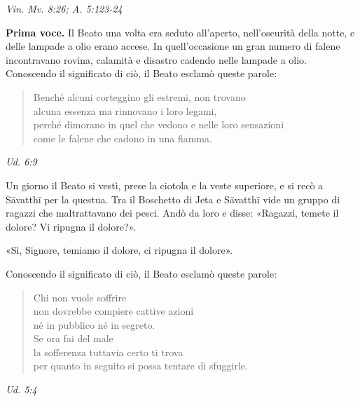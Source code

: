 \emph{Vin. Mv. 8:26; A. 5:123-24}


\textbf{Prima voce.} Il Beato una volta era seduto all’aperto, nell’oscurità
della notte, e delle lampade a olio erano accese. In quell’occasione un
gran numero di falene incontravano rovina, calamità e disastro cadendo
nelle lampade a olio. Conoscendo il significato di ciò, il Beato esclamò
queste parole:


\begin{quotation}
Benché alcuni corteggino gli estremi, non trovano \\
alcuna essenza ma rinnovano i loro legami, \\
perché dimorano in quel che vedono e nelle loro sensazioni \\
come le falene che cadono in una fiamma.
\end{quotation}

\emph{Ud. 6:9}


Un giorno il Beato si vestì, prese la ciotola e la veste superiore, e si
recò a Sāvatthī per la questua. Tra il Boschetto di Jeta e Sāvatthī vide
un gruppo di ragazzi che maltrattavano dei pesci. Andò da loro e disse:
«Ragazzi, temete il dolore? Vi ripugna il dolore?».


«Sì, Signore, temiamo il dolore, ci ripugna il dolore».


Conoscendo il significato di ciò, il Beato esclamò queste parole:


\begin{quotation}
Chi non vuole soffrire \\
non dovrebbe compiere cattive azioni \\
né in pubblico né in segreto. \\
Se ora fai del male \\
la sofferenza tuttavia certo ti trova \\
per quanto in seguito si possa tentare di sfuggirle.
\end{quotation}

\emph{Ud. 5:4}


